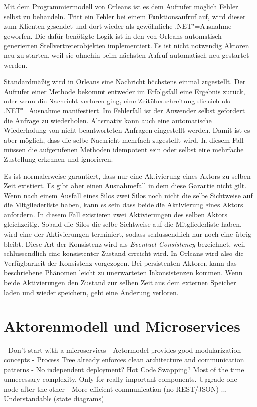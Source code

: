 Mit dem Programmiermodell von Orleans ist es dem Aufrufer möglich Fehler selbst zu behandeln. Tritt ein Fehler bei einem Funktionsaufruf auf, wird dieser zum Klienten gesendet und dort wieder als gewöhnliche .NET"=Ausnahme geworfen. Die dafür benötigte Logik ist in den von Orleans automatisch generierten Stellvertreterobjekten implementiert. Es ist nicht notwendig Aktoren neu zu starten, weil sie ohnehin beim nächsten Aufruf automatisch neu gestartet werden.

Standardmäßig wird in Orleans eine Nachricht höchstens einmal zugestellt. Der Aufrufer einer Methode bekommt entweder im Erfolgsfall eine Ergebnis zurück, oder wenn die Nachricht verloren ging, eine Zeitüberschreitung die sich als .NET"=Ausnahme manifestiert. Im Fehlerfall ist der Anwender selbst gefordert die Anfrage zu wiederholen. Alternativ kann auch eine automatische Wiederholung von nicht beantworteten Anfragen eingestellt werden. Damit ist es aber möglich, dass die selbe Nachricht mehrfach zugestellt wird. In diesem Fall müssen die aufgerufenen Methoden idempotent sein oder selbst eine mehrfache Zustellung erkennen und ignorieren.

Es ist normalerweise garantiert, dass nur eine Aktivierung eines Aktors zu selben Zeit existiert. Es gibt aber einen Ausnahmefall in dem diese Garantie nicht gilt. Wenn nach einem Ausfall eines Silos zwei Silos noch nicht die selbe Sichtweise auf die Mitgliederliste haben, kann es sein dass beide die Aktivierung eines Aktors anfordern. In diesem Fall existieren zwei Aktivierungen des selben Aktors gleichzeitig. Sobald die Silos die selbe Sichtweise auf die Mitgliederliste haben, wird eine der Aktivierungen terminiert, sodass schlussendlich nur noch eine übrig bleibt. Diese Art der Konsistenz wird als \textit{Eventual Consistency} bezeichnet, weil schlussendlich eine konsistenter Zustand erreicht wird. In Orleans wird also die Verfügbarkeit der Konsistenz vorgezogen. Bei persistenten Aktoren kann das beschriebene Phänomen leicht zu unerwarteten Inkonsistenzen kommen. Wenn beide Aktivierungen den Zustand zur selben Zeit aus dem externen Speicher laden und wieder speichern, geht eine Änderung verloren.

\pagebreak

\section{Aktorenmodell und Microservices}

- Don't start with a microservices
- Actormodel provides good modularization concepts
- Process Tree already enforces clean architecture and communication patterns
- No independent deployment? Hot Code Swapping? Most of the time unnecessary complexity. Only for really important components. Upgrade one node after the other
- More efficient communication (no REST/JSON) ...
- Understandable (state diagrams)

\iffalse

- Conclusion
  - Different Names: Actors, Processes, Grains ... same principles
	- Different Programming models: function vs oo

\fi